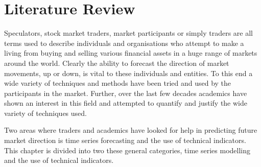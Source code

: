 
\chapter{Literature Review} %

\label{Chapter2} %





Speculators, stock market traders, market participants or simply traders are all terms used to describe individuals and organisations who attempt to make a living from buying and selling various financial assets in a huge range of markets around the world. Clearly the ability to forecast the direction of market movements, up or down, is vital to these individuals and entities. To this end a wide variety of techniques and methods have been tried and used by the participants in the market. Further, over the last few decades academics have shown an interest in this field and attempted to quantify and justify the wide variety of techniques used. 

Two areas where traders and academics have looked for help in predicting future market direction is time series forecasting and the use of technical indicators. This chapter is divided into two these general categories, time series modelling and the use of technical indicators. 


